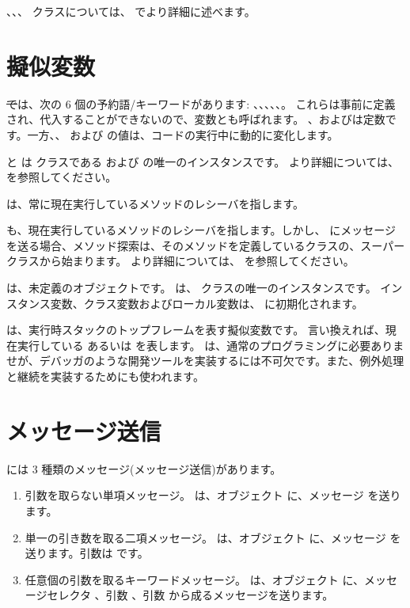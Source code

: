\documentclass[a4paper,10pt,twoside]{book}
\begin{document}
、、、 クラスについては、 でより詳細に述べます。


\section{擬似変数}

\st では、次の 6 個の予約語/キーワードがあります:
、、、、、。
これらは事前に定義され、代入することができないので、変数とも呼ばれます。
、およびは定数です。一方、、 および  の値は、コードの実行中に動的に変化します。

 と  は  クラスである  および  の唯一のインスタンスです。
より詳細については、 を参照してください。

 は、常に現在実行しているメソッドのレシーバを指します。

 も、現在実行しているメソッドのレシーバを指します。しかし、 にメッセージを送る場合、メソッド探索は、そのメソッドを定義しているクラスの、スーパークラスから始まります。
より詳細については、 を参照してください。

 は、未定義のオブジェクトです。
 は、 クラスの唯一のインスタンスです。
インスタンス変数、クラス変数およびローカル変数は、 に初期化されます。

 は、実行時スタックのトップフレームを表す擬似変数です。
言い換えれば、現在実行している  あるいは  を表します。
 は、通常のプログラミングに必要ありませが、デバッガのような開発ツールを実装するには不可欠です。また、例外処理と継続を実装するためにも使われます。

\section{メッセージ送信}

\pharo には 3 種類のメッセージ(メッセージ送信)があります。
\begin{enumerate}
  \item 引数を取らない単項メッセージ。
  は、オブジェクト  に、メッセージ  を送ります。
  \item 単一の引き数を取る二項メッセージ。
  	 は、オブジェクト  に、メッセージ \ct{+} を送ります。引数は  です。
  \item 任意個の引数を取るキーワードメッセージ。
  	 は、オブジェクト  に、メッセージセレクタ
	、引数 、引数  から成るメッセージを送ります。
\end{enumerate}
\end{document}
